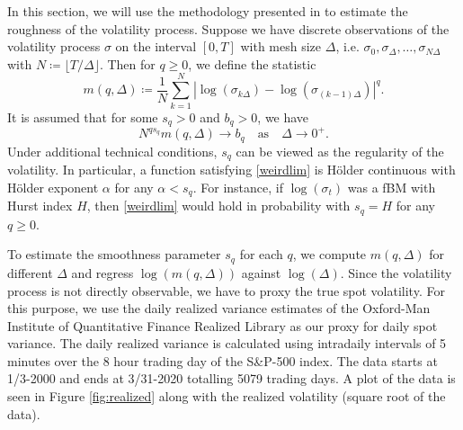 In this section, we will use the methodology presented in \cite{volisrough} to estimate the roughness of the volatility process. Suppose we have discrete observations of the volatility process $\sigma$ on the interval $[0,T]$ with mesh size $\Delta$, i.e. $\sigma_{0},\sigma_{\Delta},\dots,\sigma_{N\Delta}$ with $N\coloneqq \lfloor T/\Delta\rfloor$. Then for $q\geq 0$, we define the statistic
\begin{equation}
    m(q,\Delta)\coloneqq \frac{1}{N}\sum_{k=1}^{N}|\log(\sigma_{k\Delta})-\log(\sigma_{(k-1)\Delta})|^{q}.
\end{equation}
It is assumed that for some $s_{q}>0$ and $b_{q}>0$, we have
\begin{equation}\label{weirdlim}
    N^{qs_{q}}m(q,\Delta)\to b_{q}\quad \textrm{as}\quad \Delta\to 0^{+}.
\end{equation}
Under additional technical conditions, $s_{q}$ can be viewed as the regularity of the volatility. In particular, a function satisfying \eqref{weirdlim} is Hölder continuous with Hölder exponent $\alpha$ for any $\alpha <s_{q}$. For instance, if $\log(\sigma_{t})$ was a fBM with Hurst index $H$, then \eqref{weirdlim} would hold in probability with $s_{q}=H$ for any $q\geq 0$.

To estimate the smoothness parameter $s_{q}$ for each $q$, we compute $m(q,\Delta)$ for different $\Delta$ and regress $\log(m(q,\Delta))$ against $\log(\Delta)$. Since the volatility process is not directly observable, we have to proxy the true spot volatility. For this purpose, we use the daily realized variance estimates of the Oxford-Man Institute of Quantitative Finance Realized Library as our proxy for daily spot variance. The daily realized variance is calculated using intradaily intervals of 5 minutes over the 8 hour trading day of the S\&P-500 index. The data starts at 1/3-2000 and ends at 3/31-2020 totalling 5079 trading days. A plot of the data is seen in Figure \ref{fig:realized} along with the realized volatility (square root of the data).

